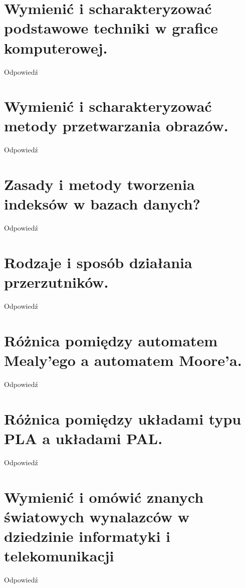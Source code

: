 \documentclass[12pt,a4paper]{article}
\begin{document}
	\section{Wymienić i scharakteryzować podstawowe techniki w grafice komputerowej.}
	Odpowiedź

	\section{Wymienić i scharakteryzować metody przetwarzania obrazów.}
	Odpowiedź

	\section{Zasady i metody tworzenia indeksów w bazach danych?}
	Odpowiedź

	\section{Rodzaje i sposób działania przerzutników.}
	Odpowiedź

	\section{Różnica pomiędzy automatem Mealy'ego a automatem Moore'a.}
	Odpowiedź

	\section{Różnica pomiędzy układami typu PLA a układami PAL.}
	Odpowiedź

	\section{Wymienić i omówić znanych światowych wynalazców w dziedzinie informatyki i telekomunikacji}
	Odpowiedź
\end{document}
